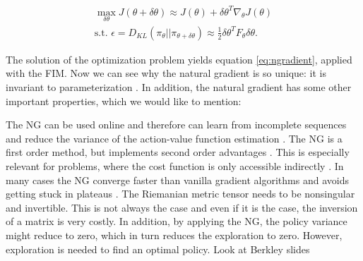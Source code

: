 \begin{align}
	\max_{\delta\theta} J(\theta + \delta\theta) \approx J(\theta) + \delta\theta^T\nabla_\theta J(\theta)\label{ng1}\\
	\text{s.t. } \epsilon = D_{KL}(\pi_{\theta} || \pi_{\theta + \delta\theta}) \approx \tfrac{1}{2} \delta\theta^T F_\theta \delta\theta\label{ng2}.
\end{align}

\noindent The solution of the optimization problem yields equation \ref{eq:ngradient}, applied with the FIM. Now we can see why the natural gradient is so unique: it is invariant to parameterization \citep{pascanu2013revisiting, peters2008natural}. In addition, the natural gradient has some other important properties, which we would like to mention:

\begin{itemize}
	\x {} The NG can be used online and therefore can learn from incomplete sequences and reduce the variance of the action-value function estimation \cite{pascanu2013revisiting, peters2008natural}.
	\x {} The NG is a first order method, but implements second order advantages \cite{pascanu2013revisiting}. This is especially relevant for problems, where the cost function is only accessible indirectly \cite{desjardins2013metric}.
	\x {} In many cases the NG converge faster than vanilla gradient algorithms \cite{sohl2012natural, amari1998natural} and avoids getting stuck in plateaus \cite{amari1998efficiently, amari1998natural}.
	\x {} The Riemanian metric tensor needs to be nonsingular and invertible. This is not always the case and even if it is the case, the inversion of a matrix is very costly. In addition, by applying the NG, the policy variance might reduce to zero, which in turn reduces the exploration to zero. However, exploration is needed to find an optimal policy.
	\x 	Look at Berkley slides
\end{itemize}

